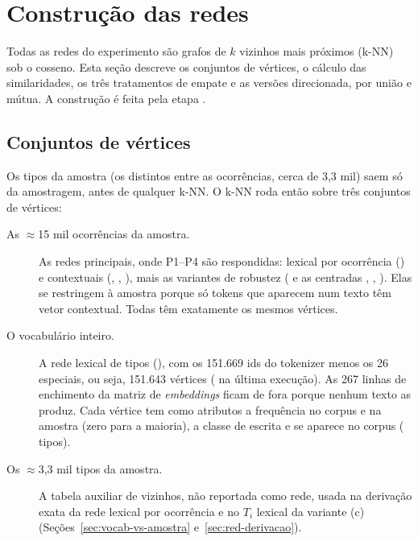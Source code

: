 \section{Construção das redes}\label{sec:redes}

Todas as redes do experimento são grafos de $k$ vizinhos mais próximos (k-NN) sob o cosseno.
Esta seção descreve os conjuntos de vértices, o cálculo das similaridades, os três tratamentos
de empate e as versões direcionada, por união e mútua. A construção é feita pela etapa
.

\subsection{Conjuntos de vértices}\label{sec:red-vertices}

Os tipos da amostra (os  distintos entre as ocorrências, cerca de 3,3 mil) saem
só da amostragem, antes de qualquer k-NN. O k-NN roda então sobre três conjuntos de vértices:
\begin{description}
    \item[As $\approx$15 mil ocorrências da amostra.] As redes principais, onde P1--P4 são
    respondidas: lexical por ocorrência () e contextuais (, ,
    ), mais as variantes de robustez ( e as centradas ,
    , ). Elas se restringem à amostra porque só tokens que aparecem num
    texto têm vetor contextual. Todas têm exatamente os mesmos \nVertices{} vértices.
    \item[O vocabulário inteiro.] A rede lexical de tipos (), com os 151.669 ids do
    tokenizer menos os 26 especiais, ou seja, 151.643 vértices (\nTiposVocab{} na última
    execução). As 267 linhas de enchimento da matriz de \emph{embeddings} ficam de fora porque
    nenhum texto as produz. Cada vértice tem como atributos a frequência no corpus e na amostra
    (zero para a maioria), a classe de escrita e se aparece no corpus (\nTiposVocabCorpus{}
    tipos).
    \item[Os $\approx$3,3 mil tipos da amostra.] A tabela auxiliar de vizinhos, não reportada
    como rede, usada na derivação exata da rede lexical por ocorrência e no $T_i$ lexical da
    variante (c) (Seções~\ref{sec:vocab-vs-amostra} e~\ref{sec:red-derivacao}).
\end{description}

